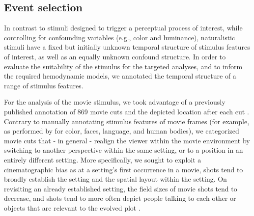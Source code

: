 \documentclass[english,11pt]{article}
\begin{document}
\subsection*{Event selection}

In contrast to stimuli designed to trigger a perceptual process of interest,
while controlling for confounding variables (e.g., color and luminance),
naturalistic stimuli have a fixed but initially unknown temporal structure of
stimulus features of interest, as well as an equally unknown confound structure.
In order to evaluate the suitability of the stimulus for the targeted analyses,
and to inform the required hemodynamic models, we annotated the temporal
structure of a range of stimulus features.

For the analysis of the movie stimulus, we took advantage of a previously
published annotation of 869 movie cuts and the depicted location after each cut
\citep{haeusler2016cutanno}.
Contrary to manually annotating stimulus features of movie frames (for example, as
performed by \citet{bartels2004mapping} for color, faces, language, and
human bodies), we categorized movie cuts that - in general - realign the viewer
within the movie environment by switching to another perspective within the
same setting, or to a position in an entirely different setting.
More specifically, we sought to exploit a cinematographic bias as
at a setting's first occurrence in a movie, shots tend to broadly establish the
setting and the spatial layout within the setting.
On revisiting an already established setting, the field sizes of movie shots
tend to decrease, and shots tend to more often depict people talking to each
other or objects that are relevant to the evolved plot
\citep{brown2012cinematography, katz1991film, mascelli1998five}.
\end{document}
